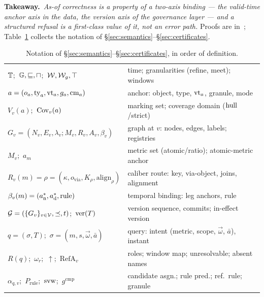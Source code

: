 \noindent{}\textbf{Takeaway.}\ \emph{As-of correctness is a property of a
two-axis binding --- the valid-time anchor axis in the data, the version axis
of the governance layer --- and a structured refusal is a first-class value of
it, not an error path.} Proofs are in~\cite{asofgov-tr};
Table~\ref{tab:notation} collects the notation of
\S\ref{sec:semantics}--\S\ref{sec:certificates}.

\begin{table}[t]
\centering
\scriptsize
\setlength{\tabcolsep}{2.2pt}
\renewcommand{\arraystretch}{0.93}
\caption{Notation of \S\ref{sec:semantics}--\S\ref{sec:certificates},
in order of definition.}
\label{tab:notation}
\begin{tabular}{@{}ll@{}}
\toprule
$\mathbb{T}$;\ $\mathbb{G},\sqsubseteq,\sqcap$;\ $\mathcal{W},\mathcal{W}_g,\top$ &
  time; granularities (refine, meet); windows\\
$a=(o_a,\mathrm{ty}_a,\mathrm{vt}_a,g_a,\mathrm{cm}_a)$ &
  anchor: object, type, $\mathrm{vt}_a$, granule, mode\\
$V_v(a)$;\ $\mathrm{Cov}_v(a)$ &
  marking set; coverage domain ($\mathrm{hull}$/strict)\\
$G_v=(N_v,E_v,\lambda_v;M_v,R_v,A_v,\beta_v)$ &
  graph at $v$: nodes, edges, labels; registries\\
$M_v$;\ $a_m$ & metric set (atomic/ratio); atomic-metric anchor\\
$R_v(m){=}\rho{=}(\kappa,o_{\mathrm{via}},K_\rho,\mathrm{align}_\rho)$ &
  caliber route: key, via-object, joins, alignment\\
$\beta_v(m)=(a^*_{\mathrm{n}},a^*_{\mathrm{d}},\mathrm{rule})$ &
  temporal binding: leg anchors, rule\\
$\mathcal{G}=(\{G_v\}_{v\in\mathcal{V}},\preceq,t)$;\ $\mathrm{ver}(T)$ &
  version sequence, commits; in-effect version\\
$q=(\sigma,T)$;\ $\sigma=(m,s,\vec\omega,\bar a)$ &
  query: intent (metric, scope, $\vec\omega$, $\bar a$), instant\\
$R(q)$;\ $\omega_r$;\ $\uparrow$;\ $\mathrm{RefA}_v$ &
  roles; window map; unresolvable; absent names\\
$\alpha_{q,v}$;\ $P_{\mathrm{rule}}$;\ $\mathrm{svw}$;\ $g^{\mathrm{cmp}}$ &
  candidate asgn.; rule pred.; ref.\ rule; granule\\

\end{tabular}
\end{table}
